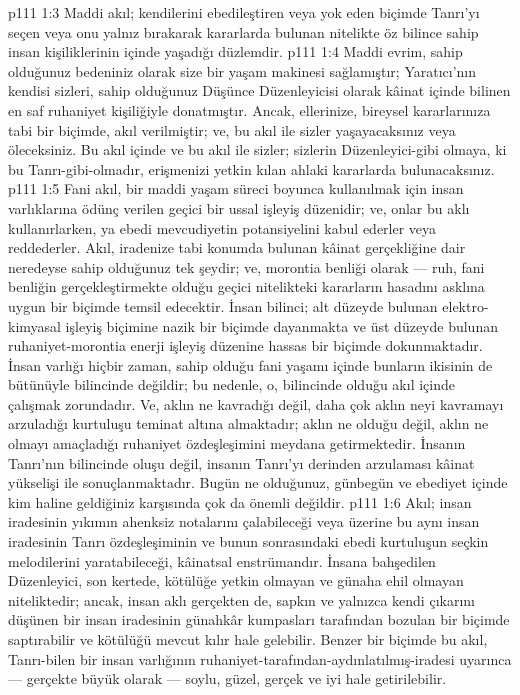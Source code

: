 \vs p111 1:3 Maddi akıl; kendilerini ebedileştiren veya yok eden biçimde Tanrı’yı seçen veya onu yalnız bırakarak kararlarda bulunan nitelikte öz bilince sahip insan kişiliklerinin içinde yaşadığı düzlemdir.
\vs p111 1:4 Maddi evrim, sahip olduğunuz bedeniniz olarak size bir yaşam makinesi sağlamıştır; Yaratıcı’nın kendisi sizleri, sahip olduğunuz Düşünce Düzenleyicisi olarak kâinat içinde bilinen en saf ruhaniyet kişiliğiyle donatmıştır. Ancak, ellerinize, bireysel kararlarınıza tabi bir biçimde, akıl verilmiştir; ve, bu akıl ile sizler yaşayacaksınız veya öleceksiniz. Bu akıl içinde ve bu akıl ile sizler; sizlerin Düzenleyici\hyp{}gibi olmaya, ki bu Tanrı\hyp{}gibi\hyp{}olmadır, erişmenizi yetkin kılan ahlaki kararlarda bulunacaksınız.
\vs p111 1:5 Fani akıl, bir maddi yaşam süreci boyunca kullanılmak için insan varlıklarına ödünç verilen geçici bir ussal işleyiş düzenidir; ve, onlar bu aklı kullanırlarken, ya ebedi mevcudiyetin potansiyelini kabul ederler veya reddederler. Akıl, iradenize tabi konumda bulunan kâinat gerçekliğine dair neredeyse sahip olduğunuz tek şeydir; ve, morontia benliği olarak --- ruh, fani benliğin gerçekleştirmekte olduğu geçici nitelikteki kararların hasadını asklına uygun bir biçimde temsil edecektir. İnsan bilinci; alt düzeyde bulunan elektro\hyp{}kimyasal işleyiş biçimine nazik bir biçimde dayanmakta ve üst düzeyde bulunan ruhaniyet\hyp{}morontia enerji işleyiş düzenine hassas bir biçimde dokunmaktadır. İnsan varlığı hiçbir zaman, sahip olduğu fani yaşamı içinde bunların ikisinin de bütünüyle bilincinde değildir; bu nedenle, o, bilincinde olduğu akıl içinde çalışmak zorundadır. Ve, aklın ne kavradığı değil, daha çok aklın neyi kavramayı arzuladığı kurtuluşu teminat altına almaktadır; aklın ne olduğu değil, aklın ne olmayı amaçladığı ruhaniyet özdeşleşimini meydana getirmektedir. İnsanın Tanrı’nın bilincinde oluşu değil, insanın Tanrı’yı derinden arzulaması kâinat yükselişi ile sonuçlanmaktadır. Bugün ne olduğunuz, günbegün ve ebediyet içinde kim haline geldiğiniz karşısında çok da önemli değildir.
\vs p111 1:6 Akıl; insan iradesinin yıkımın ahenksiz notalarını çalabileceği veya üzerine bu aynı insan iradesinin Tanrı özdeşleşiminin ve bunun sonrasındaki ebedi kurtuluşun seçkin melodilerini yaratabileceği, kâinatsal enstrümandır. İnsana bahşedilen Düzenleyici, son kertede, kötülüğe yetkin olmayan ve günaha ehil olmayan niteliktedir; ancak, insan aklı gerçekten de, sapkın ve yalnızca kendi çıkarını düşünen bir insan iradesinin günahkâr kumpasları tarafından bozulan bir biçimde saptırabilir ve kötülüğü mevcut kılır hale gelebilir. Benzer bir biçimde bu akıl, Tanrı\hyp{}bilen bir insan varlığının ruhaniyet\hyp{}tarafından\hyp{}aydınlatılmış\hyp{}iradesi uyarınca --- gerçekte büyük olarak --- soylu, güzel, gerçek ve iyi hale getirilebilir.
